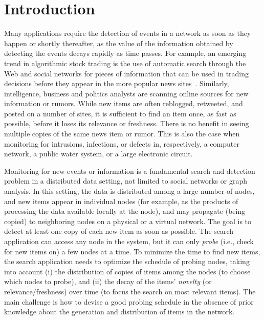\section{Introduction}\label{sec:introduction}
Many applications require the detection of events in a network as soon as they
happen or shortly thereafter, as the value of the information obtained by
detecting the events decays rapidly as time passes. For example, an emerging
trend in algorithmic stock trading is the use of automatic search through the
Web and social networks for pieces of information that can be used in trading
decisions before they appear in the more popular news
sites~\citep{Delaney2009,latar2015robot,wallstreet2015,McKinney2011}. Similarly,
intelligence, business and politics analysts are scanning online sources for new
information or rumors. While new items are often reblogged, retweeted, and
posted on a number of sites, it is sufficient to find an item once, as fast as
possible, before it loses its relevance or freshness. There is no benefit in seeing multiple
copies of the same news item or rumor. This is also the case when monitoring for
intrusions, infections, or defects in, respectively, a computer network, a
public water system, or a large electronic circuit.

Monitoring for new events or information is a fundamental search and detection
problem in a distributed data setting, not limited to social networks or graph
analysis. In this setting, the data is distributed among a large number of
nodes, and new items appear in individual nodes (for example, as the products of
processing the data available locally at the node), and may propagate (being
copied) to neighboring nodes on a physical or a virtual network. The goal is to
detect at least one copy of each new item as soon as possible. The search
application can access any node in the system, but it can only \emph{probe}
(i.e., check for new items on) a few nodes at a time. To minimize the time to
find new items, the search application needs to optimize the schedule of probing
nodes, taking into account (i) the distribution of copies of items among the
nodes (to choose which nodes to probe), and (ii) the decay of the items'
\emph{novelty} (or relevance/freshness) over time (to focus the search on most
relevant items). The main challenge is how to devise a good probing schedule in
the absence of prior knowledge about the generation and distribution of items in
the network.


